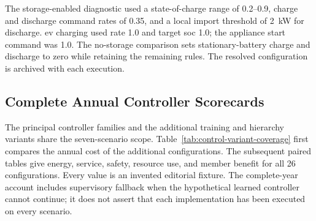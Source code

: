 The storage-enabled diagnostic used a state-of-charge range of 0.2--0.9, charge and discharge command rates of 0.35, and a local import threshold of 2~kW for discharge. \gls{ev} charging used rate 1.0 and target \gls{soc} 1.0; the appliance start command was 1.0. The no-storage comparison sets stationary-battery charge and discharge to zero while retaining the remaining rules. The resolved configuration is archived with each execution.

\subsection{Complete Annual Controller Scorecards}
\label{app:control-variant-coverage}

The principal controller families and the additional training and hierarchy variants share the seven-scenario scope. Table~\ref{tab:control-variant-coverage} first compares the annual cost of the additional configurations. The subsequent paired tables give energy, service, safety, resource use, and member benefit for all 26 configurations. Every value is an invented editorial fixture. The complete-year account includes supervisory fallback when the hypothetical learned controller cannot continue; it does not assert that each implementation has been executed on every scenario.



